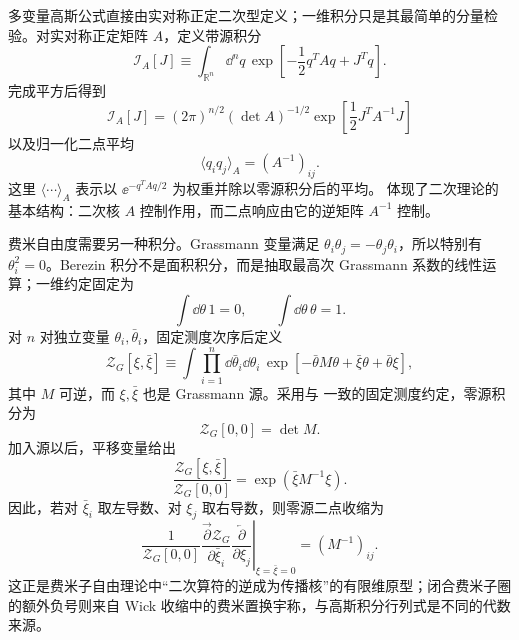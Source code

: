 
多变量高斯公式直接由实对称正定二次型定义；一维积分只是其最简单的分量检验。对实对称正定矩阵 $A$，定义带源积分
\begin{equation}
\mathcal I_A[J]\equiv
\int_{\mathbb R^n}\dd^nq\,
\exp\!\left[-\frac12q^TAq+J^Tq\right].
\label{eq:euclidean-gaussian-definition-dp68}
\end{equation}
完成平方后得到
\begin{equation}
\boxed{
\mathcal I_A[J]
=(2\pi)^{n/2}(\det A)^{-1/2}
\exp\!\left[\frac12J^TA^{-1}J\right]}
\label{eq:euclidean-gaussian-source-dp21}
\end{equation}
以及归一化二点平均
\begin{equation}
\boxed{
\langle q_iq_j\rangle_A=(A^{-1})_{ij}.}
\label{eq:gaussian-covariance-dp21}
\end{equation}
这里 $\langle\cdots\rangle_A$ 表示以 $\ee^{-q^TAq/2}$ 为权重并除以零源积分后的平均。 体现了二次理论的基本结构：二次核 $A$ 控制作用，而二点响应由它的逆矩阵 $A^{-1}$ 控制。

费米自由度需要另一种积分。Grassmann 变量满足 $\theta_i\theta_j=-\theta_j\theta_i$，所以特别有 $\theta_i^2=0$。Berezin 积分不是面积积分，而是抽取最高次 Grassmann 系数的线性运算；一维约定固定为
\begin{equation}
\int\dd\theta\,1=0,
\qquad
\int\dd\theta\,\theta=1.
\label{eq:berezin-definition-dp68}
\end{equation}
对 $n$ 对独立变量 $\theta_i,\bar\theta_i$，固定测度次序后定义
\begin{equation}
\mathcal Z_G[\xi,\bar\xi]\equiv
\int\prod_{i=1}^{n}\dd\bar\theta_i\dd\theta_i\,
\exp\!\left[-\bar\theta M\theta+\bar\xi\theta+\bar\theta\xi\right],
\label{eq:grassmann-source-definition-dp68}
\end{equation}
其中 $M$ 可逆，而 $\xi,\bar\xi$ 也是 Grassmann 源。采用与 一致的固定测度约定，零源积分为
\begin{equation}
\boxed{
\mathcal Z_G[0,0]=\det M.}
\label{eq:grassmann-gaussian-determinant-dp68}
\end{equation}
加入源以后，平移变量给出
\begin{equation}
\boxed{
\frac{\mathcal Z_G[\xi,\bar\xi]}{\mathcal Z_G[0,0]}
=\exp\!\left(\bar\xi M^{-1}\xi\right).}
\label{eq:grassmann-source-gaussian-dp68}
\end{equation}
因此，若对 $\bar\xi_i$ 取左导数、对 $\xi_j$ 取右导数，则零源二点收缩为
\begin{equation}
\boxed{
\left.
\frac{1}{\mathcal Z_G[0,0]}
\frac{\overrightarrow\partial\mathcal Z_G}{\partial\bar\xi_i}
\frac{\overleftarrow\partial}{\partial\xi_j}
\right|_{\xi=\bar\xi=0}
=(M^{-1})_{ij}.}
\label{eq:grassmann-inverse-kernel-dp68}
\end{equation}
这正是费米子自由理论中“二次算符的逆成为传播核”的有限维原型；闭合费米子圈的额外负号则来自 Wick 收缩中的费米置换宇称，与高斯积分行列式是不同的代数来源。

